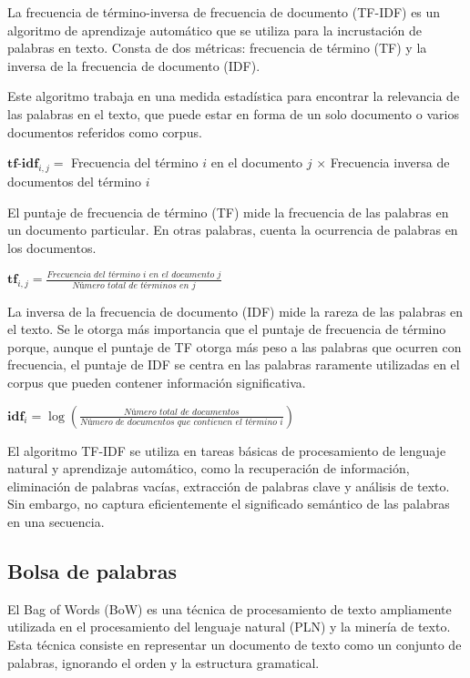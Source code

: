 La frecuencia de término-inversa de frecuencia de documento (TF-IDF) es un algoritmo de aprendizaje automático que se utiliza para la incrustación de palabras en texto. Consta de dos métricas: frecuencia de término (TF) y la inversa de la frecuencia de documento (IDF).

Este algoritmo trabaja en una medida estadística para encontrar la relevancia de las palabras en el texto, que puede estar en forma de un solo documento o varios documentos referidos como corpus.

\begin{center}
$\textbf{tf-idf}_{i,j} =$ Frecuencia del término $i$ en el documento $j$ $\times$ Frecuencia inversa de documentos del término $i$
\end{center}

El puntaje de frecuencia de término (TF) mide la frecuencia de las palabras en un documento particular. En otras palabras, cuenta la ocurrencia de palabras en los documentos.
\begin{center}
	$\textbf{tf}_{i,j} =  \frac{\textit{Frecuencia del término } i \textit{ en el documento } j}{\textit{Número total de términos en } j}$ 
\end{center}


La inversa de la frecuencia de documento (IDF) mide la rareza de las palabras en el texto. Se le otorga más importancia que el puntaje de frecuencia de término porque, aunque el puntaje de TF otorga más peso a las palabras que ocurren con frecuencia, el puntaje de IDF se centra en las palabras raramente utilizadas en el corpus que pueden contener información significativa.
\begin{center}
	$\textbf{idf}_{i} = \log \left( \frac{\textit{Número total de documentos}}{\textit{Número de documentos que contienen el término } i} \right)$
\end{center}


El algoritmo TF-IDF se utiliza en tareas básicas de procesamiento de lenguaje natural y aprendizaje automático, como la recuperación de información, eliminación de palabras vacías, extracción de palabras clave y análisis de texto. Sin embargo, no captura eficientemente el significado semántico de las palabras en una secuencia.

\subsection{Bolsa de palabras}
	
El Bag of Words (BoW) es una técnica de procesamiento de texto ampliamente utilizada en el procesamiento del lenguaje natural (PLN) y la minería de texto. Esta técnica consiste en representar un documento de texto como un conjunto de palabras, ignorando el orden y la estructura gramatical.
	
